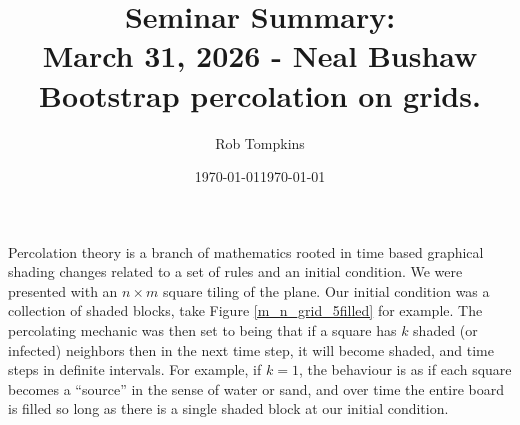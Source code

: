 \documentclass[12pt]{amsart}
\title{Seminar Summary:\\March 31, 2026 - Neal Bushaw\\Bootstrap percolation on grids.}
\author{Rob Tompkins}
\date{\today}
\theoremstyle{definition}
\theoremstyle{question}
\begin{document}
    \maketitle
    \date{\today}
    \begin{onehalfspace}
        Percolation theory is a branch of mathematics rooted in time based graphical
        shading changes related to a set of rules and an initial condition.
        We were presented with an $n\times m$ square tiling of the plane.
        Our initial condition was a collection of shaded blocks, take Figure \ref{m_n_grid_5filled}
        for example.
        The percolating mechanic was then set to being that if a square has $k$ shaded (or infected)
        neighbors then in the next time step, it will become shaded, and time steps in definite intervals.
        For example, if $k=1$, the behaviour is as if each square becomes a ``source'' in the sense of water
        or sand, and over time the entire board is filled so long as there is a single shaded block
        at our initial condition.

        \begin{figure}
\end{figure}
\end{onehalfspace}
\end{document}
